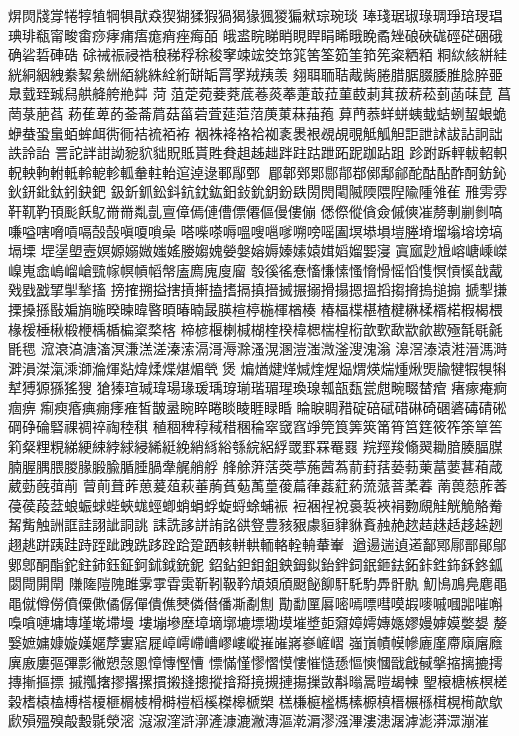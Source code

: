焺焛牋牚犈犉犆犅犋猒猋猰猢猱猳猧猲猭猦猣猵猌琮琬琰
琫琖琚琡琭琱琤琣琝琩琠琲瓻甯畯畬痧痚痡痦痝痟痤痗皕
皒盚睆睇睄睍睅睊睎睋睌矞矬硠硤硥硜硭硱硪确硰硩硨硞
硢祴祳祲祰稂稊稃稌稄窙竦竤筊筇筄筈筌筎筀筘筅粢粞粨
粡絘絯絣絓絖絧絪絏絭絜絫絒絔絩絑絟絎缾缿罥罦羢羠羡
翗聑聏聐胾胔腃腊腒腏腇脽腍脺臦臮臷臸臹舄舼舽舿艵茻
菏菹萣菀菨萒菧菤菼菶萐菆菈菫菣莿萁菝菥菘菿菡菋菎
菖菵菉萉萏菞萑萆菂菳菕菺菇菑菪萓莚菃菬菮菄菻菗菢
萛菛菾蛘蛢蛦蛓蛣蛚蛪蛝蛫蛜蛬蛩蛗蛨蛑衈衖衕袺裗袹袸
裀袾袶袼袷袽袲褁裉覕覘覗觝觚觛詎詍訹詙詀詗詘詄詅詒
詈詑詊詌詏豟貁貀貺貾貰貹貵趄趀趉跘跓跍跇跖跜跏跕跙
跈跗跅軯軷軺軹軦軮軥軵軧軨軶軫軱軬軴軩逭逴逯鄆鄬鄄
郿郼鄈郹郻鄁鄀鄇鄅鄃酡酤酟酢酠鈁鈊鈥鈃鈚鈦鈏鈌鈀
鈒釿釽鈆鈄鈧鈂鈜鈤鈙鈗鈅鈖镻閍閌閐隇陾隈隉隃隀雂雈
雃雱雰靬靰靮頇颩飫鳦⿋黹亃亄亶傽傿僆傮僄僊傴僈僂傰
僁傺傱僋僉傶傸凗剺剸剻剼嗃嗛嗌嗐嗋嗊嗝嗀嗀嗔嗄嗩喿
嗒喍嗏嗕嗢嗖嗈嗲嗍嗙嗂圔塓塨塤塏塍塉塯塕塎塝塙塥塛
堽塣塱壼嫇嫄嫋媺媸媱媵媰媿嫈媻嫆媷嫀嫊媴媶嫍媹媐寖
寘寙尟尳嵱嵣嵊嵥嵲嵬嵞嵨嵧嵢巰幏幎幊幍幋廅廌廆廋廇
彀徯徭惷慉慊愫慅愶愲愮慆愯慏愩慀戠酨戣戥戤揅揱揫搐
搒搉搠搤搳摃搟搕搘搹搷搢搣搌搦搰搨摁搵搯搊搚摀搥搧
搋揧搛搮搡搎敯斒旓暆暌暕暐暋暊暙暔晸朠楦楟椸楎楢楱
椿楅楪椹楂楗楙楺楈楉椵楬椳椽楥棰楸椴楩楀楯楄楶楘楁
楴楌椻楋椷楜楏楑椲楒椯楻椼歆歅歃歂歈歁殛毻毼毹毷毸
溛滖滈溏滀溟溓溔溠溱溹滆滒溽滁溞滉溷溰滍溦滏溲溾滃
滜滘溙溒溎溍溤溡溿溳滐滊溗溮溣煇煔煒煣煠煁煝煢煲
煸煪煡煂煘煃煋煰煟煐煓煄煍煚牏犍犌犑犐犎猼獂猻猺獀
獊獉瑄瑊瑋瑒瑑瑗瑀瑏瑐瑎瑂瑆瑍瑔瓡瓿瓾瓽甝畹畷榃痯
瘏瘃痷痾痼痹痸瘐痻痶痭痵痽皙皵盝睕睟睠睒睖睚睩睧
睔睙睭矠碇碚碔碏碄碕碅碆碡碃硹碙碀碖硻祼禂祽祹稑稘
稙稒稗稕稢稓稛稐窣窢窞竫筦筤筭筴筩筲筥筳筱筰筡筸筶
筣粲粴粯綈綆綀綍絿綅絺綎絻綃絼綌綔綄絽綒罭罫罧罨罬
羦羥羧翛翜耡腤腠腷腜腩腛腢腲朡腞腶腧腯腄腡舝艉艄艀
艂艅蓱萿葖葶葹蒏蒍葥葑葀蒆葧萰葍葽葚葙葴葳葝蔇葞萷
萺萴葺葃葸萲葅萩菙葋萯葂萭葟葰萹葎葌葒葯蓅蒎萻葇萶
萳葨葾葄萫葠葔葮葐蜋蜄蛷蜌蛺蛖蛵蝍蛸蜎蜉蜁蛶蜍蜅裖
裋裍裎裞裛裚裌裐覅覛觟觥觤觡觠觢觜触詶誆詿詡訿詷誂
誄詵誃誁詴詺谼豋豊豥豤豦貆貄貅賌赨赩趑趌趎趏趍趓趔
趐趒跰跠跬跱跮跐跩跣跢跧跲跫跴輆軿輁輀輅輇輈輂輋
遒逿遄遉逽鄐鄍鄏鄑鄖鄔鄋鄎酮酯鉈鉒鈰鈺鉦鈳鉥鉞銃鈮
鉊鉆鉭鉬鉏鉠鉧鉯鈶鉡鉰鈱鉔鉣鉐鉲鉎鉓鉌鉖鈲閟閜閞閛
隒隓隑隗雎雺雽雸雵靳靷靸靲頏頍頎颬飶飹馯馲馰馵骭骫
魛鳪鳭鳧麀⿌黽僦僔僗僨僳僛僪僝僤僓僬僰僯僣僠凘劀劁
勩勫匰厬嘧嘕嘌嘒嗼嘏嘜嘁嘓嘂嗺嘝嘄嗿嗹墉塼墐墘墆墁
塿塴墋塺墇墑墎塶墂墈塻墔墏壾奫嫜嫮嫥嫕嫪嫚嫭嫫嫳嫢
嫠嫛嫬嫞嫝嫙嫨嫟孷寠寣屣嶂嶀嵽嶆嵺嶁嵷嶊嶉嶈嵾嵼嶍
嵹嵿幘幙幓廘廑廗廎廜廕廙廒廔彄彃彯徶愬愨慁慞慱慳慒
慓慲慬憀慴慔慺慛慥愻慪慡慖戩戧戫搫摍摛摝摴摶摲摳摽
摵摦撦摎撂摞摜摋摓摠摐摿搿摬摫摙摥摷敳斠暡暠暟朅朄
朢榱榶槉榠槎榖榰榬榼榑榙榎榧榍榩榾榯榿槄榽榤槔榹槊
榚槏榳榓榪榡榞槙榗榐槂榵榥槆歊歍歋殞殟殠毃毄毾滎滵
滱漃漥滸漷滻漮漉潎漙漚漧漘漻漒滭漊漶潳滹滮漭潀漰漼
